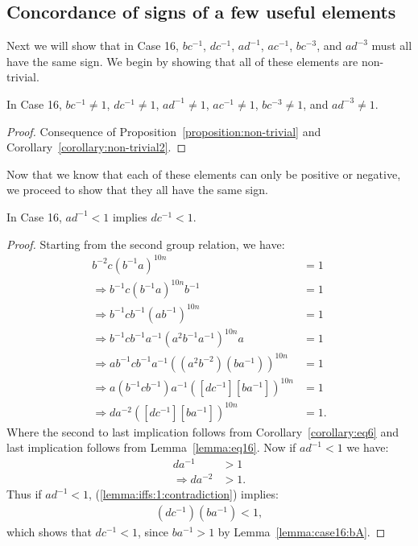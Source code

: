 \subsection{Concordance of signs of a few useful elements}

Next we will show that in Case 16, $bc^{-1}$, $dc^{-1}$, $ad^{-1}$, $ac^{-1}$, $bc^{-3}$, and $ad^{-3}$ must all have the same sign. We begin by showing that all of these elements are non-trivial.

\begin{proposition}
In Case 16, $bc^{-1}\neq1$, $dc^{-1}\neq1$, $ad^{-1}\neq1$, $ac^{-1}\neq1$, $bc^{-3}\neq1$, and $ad^{-3}\neq1$.
\end{proposition}
\begin{proof}
Consequence of Proposition~\ref{proposition:non-trivial} and Corollary~\ref{corollary:non-trivial2}.
\end{proof}

\noindent{}Now that we know that each of these elements can only be positive or negative, we proceed to show that they all have the same sign.


\begin{lemma} In Case 16, $ad^{-1}<1$ implies $dc^{-1}<1$.
\label{lemma:iffs:1}
\end{lemma}
\begin{proof}
Starting from the second group relation, we have:
\begin{align}
b^{-2}c(b^{-1}a)^{10n}&=1\nonumber{}\\
\Rightarrow{}b^{-1}c(b^{-1}a)^{10n}b^{-1}&=1\nonumber{}\\
\Rightarrow{}b^{-1}cb^{-1}(ab^{-1})^{10n}&=1\nonumber{}\\
\Rightarrow{}b^{-1}cb^{-1}a^{-1}(a^{2}b^{-1}a^{-1})^{10n}a&=1\nonumber{}\\
\Rightarrow{}ab^{-1}cb^{-1}a^{-1}((a^{2}b^{-2})(ba^{-1}))^{10n}&=1\nonumber{}\\
\Rightarrow{}a(b^{-1}cb^{-1})a^{-1}([dc^{-1}][ba^{-1}])^{10n}&=1\nonumber{}\\
\Rightarrow{}da^{-2}([dc^{-1}][ba^{-1}])^{10n}&=1.\label{lemma:iffs:1:contradiction}
\end{align}
Where the second to last implication follows from Corollary~\ref{corollary:eq6} and last implication follows from Lemma~\ref{lemma:eq16}. Now if $ad^{-1}<1$ we have:
\begin{align*}
da^{-1}&>1\\
\Rightarrow{}da^{-2}&>1.
\end{align*}
Thus if $ad^{-1}<1$, (\ref{lemma:iffs:1:contradiction}) implies:
\begin{align*}
(dc^{-1})(ba^{-1})<1,
\end{align*}
which shows that $dc^{-1}<1$, since $ba^{-1}>1$ by Lemma~\ref{lemma:case16:bA}.
\end{proof}

